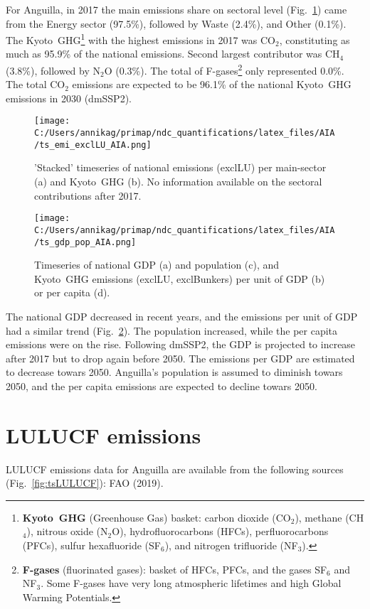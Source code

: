 \documentclass[12pt]{article}
\begin{document}
 For Anguilla, in 2017 the main emissions share on sectoral level (Fig.~\ref{fig:tsEmi}) came from the Energy sector (97.5\%), followed by Waste (2.4\%), and Other (0.1\%). 
 The Kyoto~GHG\footnote{\textbf{Kyoto~GHG} (Greenhouse Gas) basket: carbon dioxide (CO$_2$), methane (CH$_4$), nitrous oxide (N$_2$O), hydrofluorocarbons (HFCs), perfluorocarbons (PFCs), sulfur hexafluoride (SF$_6$), and nitrogen trifluoride (NF$_3$).} with the highest emissions in 2017 was CO$_2$, constituting as much as 95.9\% of the national emissions. 
 Second largest contributor was CH$_4$ (3.8\%), followed by N$_2$O (0.3\%). 
 The total of F-gases\footnote{\textbf{F-gases} (fluorinated gases): basket of HFCs, PFCs, and the gases SF$_6$ and NF$_3$. 
 Some F-gases have very long atmospheric lifetimes and high Global Warming Potentials.} only represented 0.0\%.
 The total CO$_2$ emissions are expected to be 96.1\% of the national Kyoto~GHG emissions in 2030 (dmSSP2).
 \begin{figure}[htbp]
 \centering
 \texttt{[image: C:/Users/annikag/primap/ndc\_quantifications/latex\_files/AIA/ts\_emi\_exclLU\_AIA.png]}
 \caption{'Stacked' timeseries of national emissions (exclLU) per main-sector (a) and Kyoto~GHG (b). 
 No information available on the sectoral contributions after 2017.}
 \label{fig:tsEmi}
 \end{figure}
 \begin{figure}[htbp]
 \centering
 \texttt{[image: C:/Users/annikag/primap/ndc\_quantifications/latex\_files/AIA/ts\_gdp\_pop\_AIA.png]}
 \caption{Timeseries of national GDP (a) and population (c), and Kyoto~GHG emissions (exclLU, exclBunkers) per unit of GDP (b) or per capita (d).}
 \label{fig:tsSocioEco}
 \end{figure}

 The national GDP decreased in recent years, and the emissions per unit of GDP had a similar trend (Fig.~\ref{fig:tsSocioEco}).
 The population increased, while the per capita emissions were on the rise. 
 Following dmSSP2, the GDP is projected to increase after 2017 but to drop again before 2050. 
 The emissions per GDP are estimated to decrease towars 2050. 
 Anguilla's population is assumed to diminish towars 2050, and the per capita emissions are expected to decline towars 2050. 

 \section{LULUCF emissions}
 \label{sec:emiLULUCF}
 LULUCF emissions data for Anguilla are available from the following sources (Fig.~\ref{fig:tsLULUCF}): FAO (2019).
\end{document}
